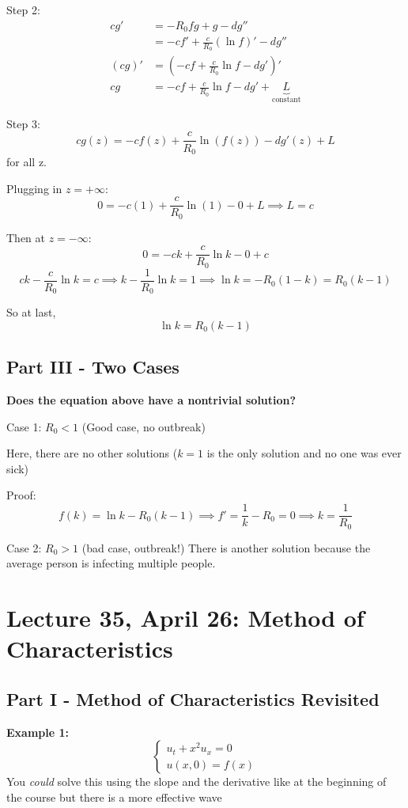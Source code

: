 \documentclass[12pt]{article}
\begin{document}
Step 2: 
\begin{align*}
    cg' &= -R_0 fg + g - dg''\\
    &= -cf' + \frac{c}{R_0}(\ln f)' - dg''\\
    (cg)' &= (-cf + \frac{c}{R_0}\ln f - dg')'\\
    cg &= -cf + \frac{c}{R_0}\ln f - dg' + \underbrace{L}_{\text{constant}}
\end{align*}

Step 3:
\[cg(z) = -cf(z) + \frac{c}{R_0}\ln(f(z)) - dg'(z) + L\]
for all z. 

Plugging in $z = +\infty$:
\[0 = -c(1) + \frac{c}{R_0}\ln (1) - 0 + L \implies L=c\]

Then at $z = -\infty$:
\[0 = -ck + \frac{c}{R_0}\ln k - 0 + c\]
\[ck - \frac{c}{R_0}\ln k = c \implies k - \frac{1}{R_0}\ln k = 1 \implies \ln k = -R_0(1 - k) = R_0(k - 1)\]

So at last, 
\[\boxed{\ln k = R_0(k - 1)}\]

\subsection*{Part III - Two Cases}
\textbf{Does the equation above have a nontrivial solution?}

Case 1: $R_0 < 1$ (Good case, no outbreak)

Here, there are no other solutions ($k=1$ is the only solution and no one was ever sick)

Proof: 
\[f(k) = \ln k - R_0(k - 1)\implies f' = \frac{1}{k} - R_0 = 0 \implies k = \frac{1}{R_0}\] 


Case 2: $R_0 > 1$ (bad case, outbreak!)
There is another solution because the average person is infecting multiple people.

\section*{Lecture 35, April 26: Method of Characteristics}
\subsection*{Part I - Method of Characteristics Revisited}
\textbf{Example 1:}
\[\begin{cases}
    u_t + x^2 u_x = 0\\
    u(x, 0) = f(x)
\end{cases}\]
You \emph{could} solve this using the slope and the derivative like at the beginning of the course but there is a more effective wave 
\end{document}
